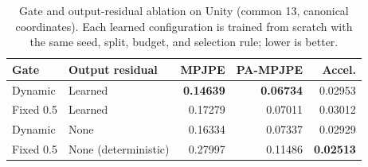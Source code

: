 \documentclass[preprint,12pt]{elsarticle}
\providecommand{\DIFaddbegin}{} %
\providecommand{\DIFaddend}{} %
\providecommand{\DIFdelbegin}{} %
\providecommand{\DIFdelend}{} %
\begin{document}
\DIFdelbegin %
\DIFdelend \DIFaddbegin \begin{table}[htbp]
\centering
\caption{Gate and output-residual ablation on Unity (common 13, canonical coordinates). Each learned configuration is trained from scratch with the same seed, split, budget, and selection rule; lower is better.}
\label{tab:gate_retraining}
\small
\setlength{\tabcolsep}{5pt}
\begin{tabular}{llrrr}
\toprule
Gate & Output residual & MPJPE & PA-MPJPE & Accel. \\
\midrule
Dynamic & Learned & \textbf{0.14639} & \textbf{0.06734} & 0.02953 \\
Fixed 0.5 & Learned & 0.17279 & 0.07011 & 0.03012 \\
Dynamic & None & 0.16334 & 0.07337 & 0.02929 \\
Fixed 0.5 & None (deterministic) & 0.27997 & 0.11486 & \textbf{0.02513} \\
\bottomrule
\end{tabular}
\end{table}
\DIFaddend 
\end{document}
